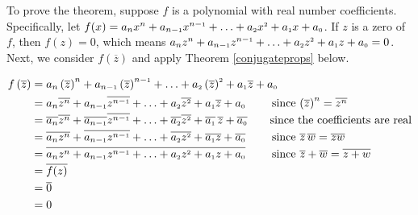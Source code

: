 \smallskip


\smallskip

To prove the theorem, suppose $f$ is a polynomial with real number coefficients.  Specifically, let 
$ f(x) = a_{n} x^{n} + a_{n-\mbox{\tiny$1$}} x^{n-\mbox{\tiny$1$}} + \ldots + a_{\mbox{\tiny $2$}} x^{\mbox{\tiny $2$}} + a_{\mbox{\tiny $1$}} x + a_{\mbox{\tiny $0$}}$.  If $z$ is a zero of $f$, then $f(z) = 0$, which means $a_{n} z^{n} + a_{n-\mbox{\tiny$1$}} z^{n-\mbox{\tiny$1$}} + \ldots + a_{\mbox{\tiny $2$}} z^{\mbox{\tiny $2$}} + a_{\mbox{\tiny $1$}} z + a_{\mbox{\tiny $0$}} = 0$.  Next, we consider $f\left(\overline{z}\right)$ and apply Theorem \ref{conjugateprops} below.

\begin{align*}
 f\left(\overline{z}\right) & =   a_{n} \left(\overline{z}\right)^{n} + a_{n-\mbox{\tiny$1$}} \left(\overline{z}\right)^{n-\mbox{\tiny$1$}} + \ldots + a_{\mbox{\tiny $2$}}\left( \overline{z}\right)^{\mbox{\tiny $2$}} + a_{\mbox{\tiny $1$}} \overline{z} + a_{\mbox{\tiny $0$}}  \\  
 &  =  a_{n}\overline{z^{n}} + a_{n-\mbox{\tiny$1$}}\overline{z^{n-\mbox{\tiny$1$}}} + \ldots + a_{\mbox{\tiny $2$}}\overline{z^{\mbox{\tiny $2$}}} + a_{\mbox{\tiny $1$}} \overline{z} + a_{\mbox{\tiny $0$}}  \tag*{ since $\left(\overline{z}\right)^n = \overline{z^{n}}$}\\  
 & =  \overline{a_{n}}\overline{z^{n}} + \overline{a_{n-\mbox{\tiny$1$}}}\overline{z^{n-\mbox{\tiny$1$}}} + \ldots +  \overline{a_{\mbox{\tiny $2$}}}\overline{z^{\mbox{\tiny $2$}}} + \overline{a_{\mbox{\tiny $1$}}}\, \overline{z} + \overline{a_{\mbox{\tiny $0$}}}  \tag*{since the coefficients are real} \\  
 & =  \overline{a_{n} z^{n}} + \overline{a_{n-\mbox{\tiny$1$}} z^{n-\mbox{\tiny$1$}}} + \ldots +  \overline{a_{\mbox{\tiny $2$}} z^{\mbox{\tiny $2$}}} + \overline{a_{\mbox{\tiny $1$}} z} + \overline{a_{\mbox{\tiny $0$}}}  \tag*{ since $\overline{z} \, \overline{w}=\overline{zw} $}\\  
 & =  \overline{a_{n} z^{n} + a_{n-\mbox{\tiny$1$}} z^{n-\mbox{\tiny$1$}} + \ldots + a_{\mbox{\tiny $2$}} z^{\mbox{\tiny $2$}} + a_{\mbox{\tiny $1$}} z + a_{\mbox{\tiny $0$}}}  \tag*{ since $ \overline{z} + \overline{w} = \overline{z+w} $}\\ 
 & =  \overline{f(z)}  \\  
 & =  \overline{0}  \\  
 & =  0
 \end{align*}

